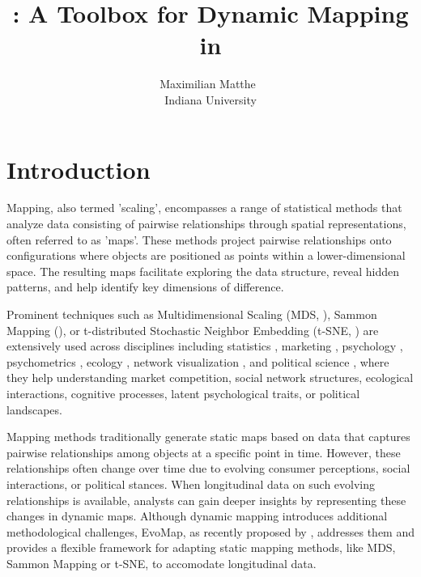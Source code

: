 \documentclass[article]{jss}
\author{Maximilian Matthe~\orcidlink{0000-0002-5059-4789}\\Indiana University}
\title{\proglang{evomap}: A Toolbox for Dynamic Mapping in \proglang{Python}}
\begin{document}


\section[Introduction]{Introduction} \label{sec:intro}

Mapping, also termed 'scaling', encompasses a range of statistical methods that analyze data 
consisting of pairwise relationships through spatial representations, often referred to as 'maps'. 
These methods project pairwise relationships onto configurations where objects are positioned 
as points within a lower-dimensional space. The resulting maps facilitate exploring the data structure, reveal hidden patterns, 
and help identify key dimensions of difference.

Prominent techniques such as Multidimensional Scaling (MDS, \cite{Carroll+Arabie:1998}), 
Sammon Mapping (\cite{Sammon:1969}), or t-distributed Stochastic Neighbor Embedding 
(t-SNE, \cite{van-der-Maaten+Hinton:2008}) are extensively used across disciplines including 
statistics \citep{Saeed+etal:2019}, marketing \citep{DeSarbo+Manrai+Manrai:1994}, 
psychology \citep{Goodwill+Alasdair+Meloy:2019}, 
psychometrics \citep{Hebart+Zheng+Pereira+Baker:2020}, 
ecology \citep{Kenkel+Orloci:1986}, 
network visualization \citep{Mane+Boerner:2004}, 
and political science \citep{Jacoby+Armstrong:2014}, where they help understanding 
market competition, social network structures, ecological interactions, cognitive processes, 
latent psychological traits, or political landscapes. 

Mapping methods traditionally generate static maps based on data that captures pairwise relationships among objects 
at a specific point in time. However, these relationships often change over time due to evolving consumer perceptions, 
social interactions, or political stances. When longitudinal data on such evolving relationships is available, 
analysts can gain deeper insights by representing these changes in dynamic maps. Although dynamic mapping introduces
additional methodological challenges, EvoMap, as recently proposed by \citep{Matthe+Ringel+Skiera:2023}, addresses them
and provides a flexible framework for adapting static mapping methods, like MDS, Sammon Mapping or t-SNE, to accomodate longitudinal data.
\end{document}
